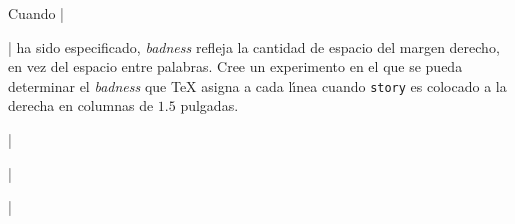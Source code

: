 


\bigskip

\enunciadoS Cuando |\raggedright| ha sido especificado, {\it badness}
refleja la cantidad de espacio del margen derecho, en vez del espacio
entre palabras.  Cree un experimento en el que se pueda determinar el
{\it badness} que {\TeX} asigna a cada l\'{\i}nea cuando {\tt story}
es colocado a la derecha en columnas de $1.5$ pulgadas.

\bigskip

\respuesta{}

|\hsize=1.5in  \raggedright {} |

|

\medskip

\hsize=1.5in  \raggedright {} 

\bye